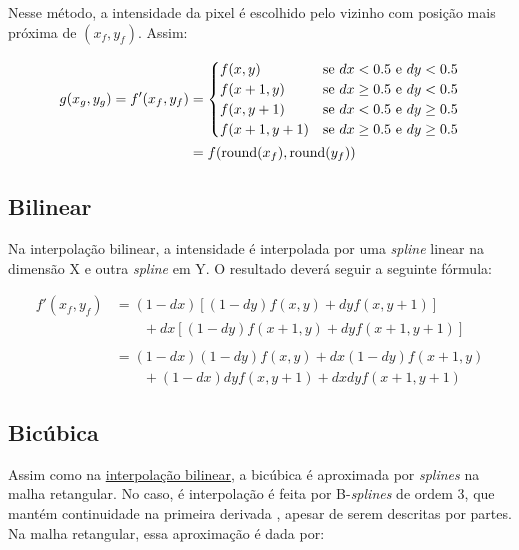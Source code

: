 Nesse método, a intensidade da pixel é escolhido pelo vizinho com posição mais próxima de $(x_f, y_f)$. Assim: %

\begin{align*}
    g(x_g, y_g) = f'(x_f, y_f) &= \begin{cases}
        f(x, y) & \text{se } dx < 0.5 \text{ e } dy < 0.5 \\
        f(x+1, y) & \text{se } dx \geq 0.5 \text{ e } dy < 0.5 \\
        f(x, y+1) & \text{se } dx < 0.5 \text{ e } dy \geq 0.5 \\
        f(x+1, y+1) & \text{se } dx \geq 0.5 \text{ e } dy \geq 0.5 \\
    \end{cases} \\
    &= f(\operatorname{round}(x_f), \operatorname{round}(y_f))
\end{align*}

\subsection{Bilinear} \label{sec:interp:bilinear}

Na interpolação bilinear, a intensidade é interpolada por uma \textit{spline} \autocite{spline} linear na dimensão X e outra \textit{spline} em Y. O resultado deverá seguir a seguinte fórmula:

\begin{align*}
    f'(x_f, y_f) &= (1-dx) \left[(1-dy) f(x,y) + dy f(x,y+1)\right] \\
        &\qquad + dx \left[(1-dy) f(x+1,y) + dy f(x+1,y+1)\right] \\
        \\
        &= (1-dx) (1-dy) f(x,y) + dx (1 - dy) f(x+1,y) \\
        &\qquad + (1-dx) dy f(x,y+1) + dx dy f(x+1,y+1)
\end{align*}

\subsection{Bicúbica} \label{sec:interp:bicubica}

Assim como na \hyperref[sec:interp:bilinear]{interpolação bilinear}, a bicúbica é aproximada por \textit{splines} na malha retangular. No caso, é interpolação é feita por B-\textit{splines} \autocite{bspline} de ordem 3, que mantém continuidade na primeira derivada \autocite{bicubic}, apesar de serem descritas por partes. Na malha retangular, essa aproximação é dada por:

